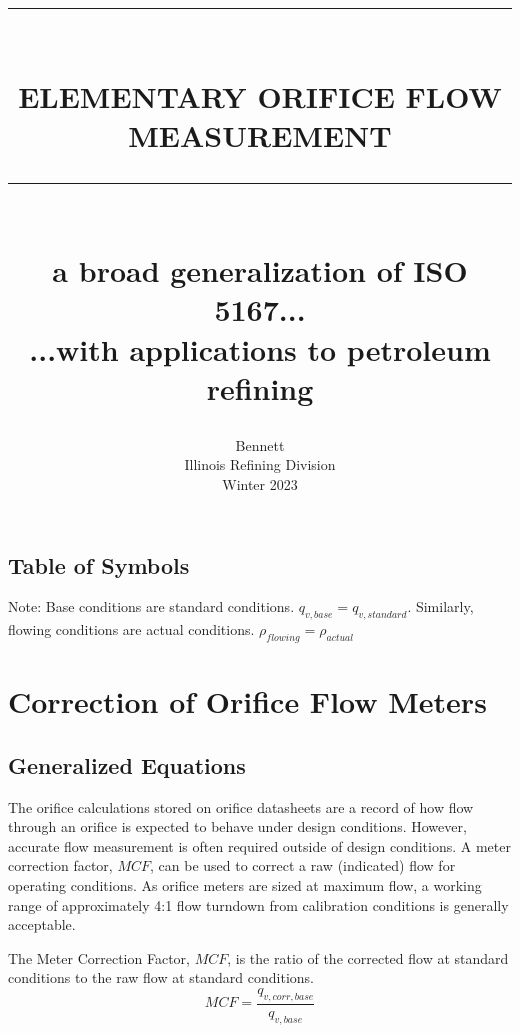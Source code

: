 \documentclass{article}
\newcommand{\HRule}[1]{\rule{\linewidth}{#1}}
\begin{document}

\title{ \normalsize \textsc{}
		\\ [2.0cm]
		\HRule{1.5pt} \\
		\Large \textbf{\uppercase{Elementary Orifice Flow Measurement}}
		\HRule{2.0pt} \\ [0.6cm] \large{a broad generalization of ISO 5167... \\...with applications to petroleum refining} \vspace*{15\baselineskip}
		}
\date{}
\author{	Bennett \\
		Illinois Refining Division \\
	    Winter 2023}

\maketitle
\newpage

\tableofcontents
\newpage

\subsection{Table of Symbols}

Note:  Base conditions are standard conditions. $q_{v, base} = q_{v, standard}$. Similarly, flowing conditions are actual conditions. $\rho_{flowing} = \rho_{actual}$
\newpage
\section{Correction of Orifice Flow Meters}
\subsection{Generalized Equations}
The orifice calculations stored on orifice datasheets are a record of how flow through an orifice is expected to behave under design conditions. However, accurate flow measurement is often required outside of design conditions. A meter correction factor, $MCF$, can be used to correct a raw (indicated) flow for operating conditions. As orifice meters are sized at maximum flow, a working range of approximately 4:1 flow turndown from calibration conditions is generally acceptable.

\begin{definition}The Meter Correction Factor, $MCF$, is the ratio of the corrected flow at standard conditions to the raw flow at standard conditions. 
\begin{equation}
    MCF = \frac{q_{v, corr, base}}{q_{v, base}}
\end{equation}
\end{definition}
\end{document}
